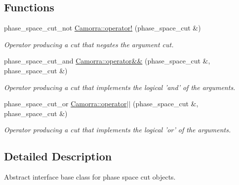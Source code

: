 \subsection*{Functions}
\begin{DoxyCompactItemize}
\item 
\hypertarget{a00800_a1f5ccdc3d0cd7041e2dfa03495ca01fa}{
phase\_\-space\_\-cut\_\-not \hyperlink{a00800_a1f5ccdc3d0cd7041e2dfa03495ca01fa}{Camorra::operator!} (phase\_\-space\_\-cut \&)}
\label{a00800_a1f5ccdc3d0cd7041e2dfa03495ca01fa}

\begin{DoxyCompactList}\small\item\em Operator producing a cut that negates the argument cut. \end{DoxyCompactList}\item 
\hypertarget{a00800_a5bdba69fe44a0b1890f73196a949e3ad}{
phase\_\-space\_\-cut\_\-and \hyperlink{a00800_a5bdba69fe44a0b1890f73196a949e3ad}{Camorra::operator\&\&} (phase\_\-space\_\-cut \&, phase\_\-space\_\-cut \&)}
\label{a00800_a5bdba69fe44a0b1890f73196a949e3ad}

\begin{DoxyCompactList}\small\item\em Operator producing a cut that implements the logical 'and' of the arguments. \end{DoxyCompactList}\item 
\hypertarget{a00800_a61bfac64ab255ec8cb7e13ffe931e0ed}{
phase\_\-space\_\-cut\_\-or \hyperlink{a00800_a61bfac64ab255ec8cb7e13ffe931e0ed}{Camorra::operator$|$$|$} (phase\_\-space\_\-cut \&, phase\_\-space\_\-cut \&)}
\label{a00800_a61bfac64ab255ec8cb7e13ffe931e0ed}

\begin{DoxyCompactList}\small\item\em Operator producing a cut that implements the logical 'or' of the arguments. \end{DoxyCompactList}\end{DoxyCompactItemize}


\subsection{Detailed Description}
Abstract interface base class for phase space cut objects. 